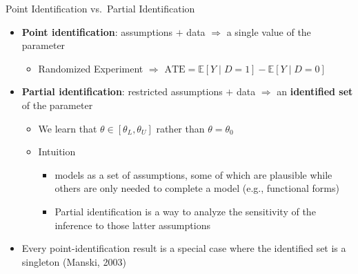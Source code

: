 \documentclass[10pt]{beamer}
\newcommand{\E}{\mathbb{E}}
\begin{document}
\begin{frame}{Point Identification vs.\ Partial Identification}
  \begin{itemize}
    \item \textbf{Point identification}: assumptions $+$ data $\Rightarrow$ a single value of the parameter
      \begin{itemize}
        \item Randomized Experiment $\Rightarrow$ $\text{ATE} = \E[Y \mid D=1] - \E[Y \mid D=0]$
      \end{itemize}
      \item \textbf{Partial identification}: restricted assumptions $+$ data $\Rightarrow$ an \textbf{identified set} of the parameter
      \begin{itemize}
        \item We learn that $\theta \in [\theta_L, \theta_U]$ rather than $\theta = \theta_0$
        \item Intuition
        \begin{itemize}
          \item models as a set of assumptions, some of which are plausible while others are only needed to complete a model (e.g., functional forms) 
          \item Partial identification is a way to analyze the sensitivity of the inference to those latter assumptions
        \end{itemize}      
      \end{itemize}
      \item Every point-identification result is a special case where the identified set is a singleton (Manski, 2003)
  \end{itemize}
\end{frame}
\end{document}
